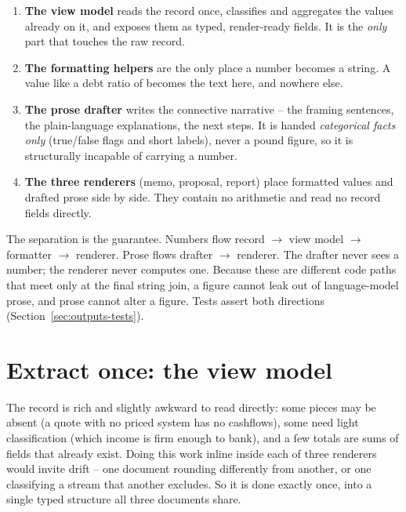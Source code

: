 \begin{enumerate}
  \item \textbf{The view model} reads the record once, classifies and aggregates the values already on it, and exposes them as typed, render-ready fields. It is the \emph{only} part that touches the raw record.
  \item \textbf{The formatting helpers} are the only place a number becomes a string. A value like a debt ratio of  becomes the text  here, and nowhere else.
  \item \textbf{The prose drafter} writes the connective narrative -- the framing sentences, the plain-language explanations, the next steps. It is handed \emph{categorical facts only} (true/false flags and short labels), never a pound figure, so it is structurally incapable of carrying a number.
  \item \textbf{The three renderers} (memo, proposal, report) place formatted values and drafted prose side by side. They contain no arithmetic and read no record fields directly.
\end{enumerate}

\begin{keyidea}
The separation is the guarantee. Numbers flow record \(\rightarrow\) view model \(\rightarrow\) formatter \(\rightarrow\) renderer. Prose flows drafter \(\rightarrow\) renderer. The drafter never sees a number; the renderer never computes one. Because these are different code paths that meet only at the final string join, a figure cannot leak out of language-model prose, and prose cannot alter a figure. Tests assert both directions (Section~\ref{sec:outputs-tests}).
\end{keyidea}

\section{Extract once: the view model}

The record is rich and slightly awkward to read directly: some pieces may be absent (a quote with no priced system has no cashflows), some need light classification (which income is firm enough to bank), and a few totals are sums of fields that already exist. Doing this work inline inside each of three renderers would invite drift -- one document rounding differently from another, or one classifying a stream that another excludes. So it is done exactly once, into a single typed structure all three documents share.

